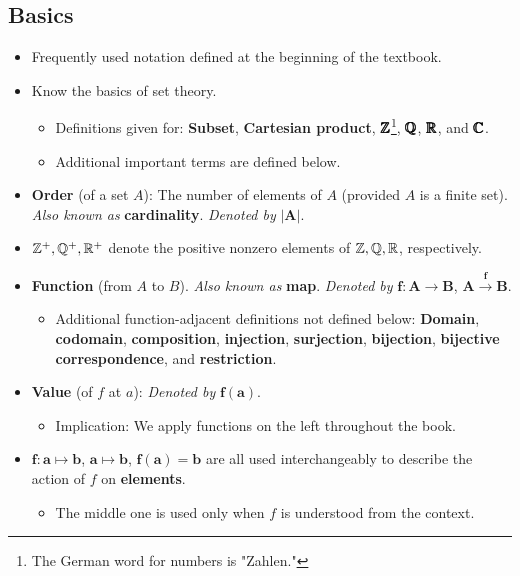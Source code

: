 \documentclass[../notes.tex]{subfiles}
\begin{document}
\subsection*{Basics}
\begin{itemize}
    \item {}Frequently used notation defined at the beginning of the textbook.
    \item Know the basics of set theory.
    \begin{itemize}
        \item Definitions given for: \textbf{Subset}, \textbf{Cartesian product}, $\pmb{\mathbb{Z}}$\footnote{The German word for numbers is "Zahlen."}, $\pmb{\mathbb{Q}}$, $\pmb{\mathbb{R}}$, and $\pmb{\mathbb{C}}$.
        \item Additional important terms are defined below.
    \end{itemize}
    \item \textbf{Order} (of a set $A$): The number of elements of $A$ (provided $A$ is a finite set). \emph{Also known as} \textbf{cardinality}. \emph{Denoted by} $\bm{|A|}$.
    \item $\mathbb{Z}^+,\mathbb{Q}^+,\mathbb{R}^+$ denote the positive nonzero elements of $\mathbb{Z},\mathbb{Q},\mathbb{R}$, respectively.
    \item \textbf{Function} (from $A$ to $B$). \emph{Also known as} \textbf{map}. \emph{Denoted by} $\bm{f:A\to B}$, $\bm{A\xrightarrow{f}{B}}$.
    \begin{itemize}
        \item Additional function-adjacent definitions not defined below: \textbf{Domain}, \textbf{codomain}, \textbf{composition}, \textbf{injection}, \textbf{surjection}, \textbf{bijection}, \textbf{bijective correspondence}, and \textbf{restriction}.
    \end{itemize}
    \item \textbf{Value} (of $f$ at $a$): \emph{Denoted by} $\bm{f(a)}$.
    \begin{itemize}
        \item Implication: We apply functions on the left throughout the book.
    \end{itemize}
    \item $\bm{f:a\mapsto b}$, $\bm{a\mapsto b}$, $\bm{f(a)=b}$ are all used interchangeably to describe the action of $f$ on \textbf{elements}.
    \begin{itemize}
        \item The middle one is used only when $f$ is understood from the context.
    \end{itemize}

\end{itemize}
\end{document}
